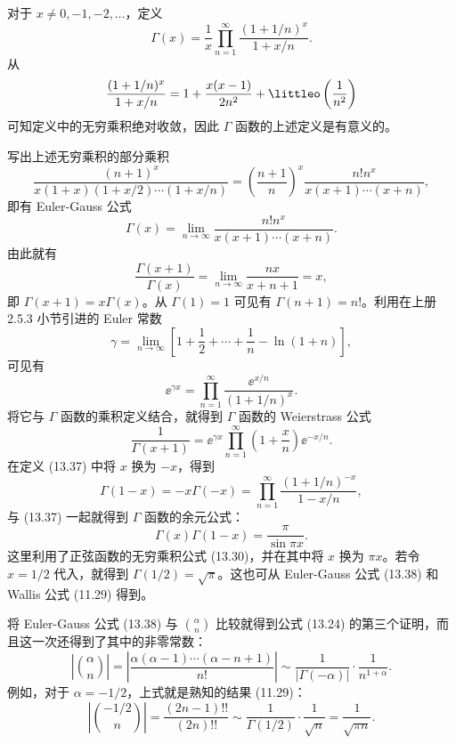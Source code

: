 \begin{xexample}[13.4.4]
对于 $x\neq0,-1,-2,\ldots$，定义
\begin{equation}
\Gamma(x)=\frac1x\prod_{n=1}^{\infty}\frac{(1+1/n)^x}{1+x/n}.
\tag{13.37}
\end{equation}
从
\[
\frac{(1+1/n)^x}{1+x/n}=1+\frac{x(x-1)}{2n^2}+\littleo\left(\frac1{n^2}\right)
\]
可知定义中的无穷乘积绝对收敛，因此 $\Gamma$ 函数的上述定义是有意义的。

写出上述无穷乘积的部分乘积
\[
\frac{(n+1)^x}{x(1+x)(1+x/2)\cdots(1+x/n)}
=\left(\frac{n+1}{n}\right)^x\frac{n!n^x}{x(x+1)\cdots(x+n)},
\]
即有 Euler-Gauss 公式
\begin{equation}
\Gamma(x)=\lim_{n\to\infty}\frac{n!n^x}{x(x+1)\cdots(x+n)}.
\tag{13.38}
\end{equation}
由此就有
\[
\frac{\Gamma(x+1)}{\Gamma(x)}=\lim_{n\to\infty}\frac{nx}{x+n+1}=x,
\]
即 $\Gamma(x+1)=x\Gamma(x)$。从 $\Gamma(1)=1$ 可见有 $\Gamma(n+1)=n!$。利用在上册 2.5.3 小节引进的 Euler 常数
\[
\gamma=\lim_{n\to\infty}\left[1+\frac12+\cdots+\frac1n-\ln(1+n)\right],
\]
可见有
\[
\ee^{\gamma x}=\prod_{n=1}^{\infty}\frac{\ee^{x/n}}{(1+1/n)^x}.
\]
将它与 $\Gamma$ 函数的乘积定义结合，就得到 $\Gamma$ 函数的 Weierstrass 公式
\begin{equation}
\frac1{\Gamma(x+1)}=\ee^{\gamma x}\prod_{n=1}^{\infty}\left(1+\frac xn\right)\ee^{-x/n}.
\tag{13.39}
\end{equation}
在定义 (13.37) 中将 $x$ 换为 $-x$，得到
\[
\Gamma(1-x)=-x\Gamma(-x)=\prod_{n=1}^{\infty}\frac{(1+1/n)^{-x}}{1-x/n},
\]
与 (13.37) 一起就得到 $\Gamma$ 函数的余元公式：
\begin{equation}
\Gamma(x)\Gamma(1-x)=\frac\pi{\sin\pi x}.
\tag{13.40}
\end{equation}
这里利用了正弦函数的无穷乘积公式 (13.30)，并在其中将 $x$ 换为 $\pi x$。若令 $x=1/2$ 代入，就得到 $\Gamma(1/2)=\sqrt\pi$。这也可从 Euler-Gauss 公式 (13.38) 和 Wallis 公式 (11.29) 得到。
\end{xexample}

\begin{xremark}
将 Euler-Gauss 公式 (13.38) 与 $\binom{\alpha}{n}$ 比较就得到公式 (13.24) 的第三个证明，而且这一次还得到了其中的非零常数：
\begin{equation}
\left|\binom{\alpha}{n}\right|=\left|\frac{\alpha(\alpha-1)\cdots(\alpha-n+1)}{n!}\right|\sim\frac1{|\Gamma(-\alpha)|}\cdot\frac1{n^{1+\alpha}}.
\tag{13.41}
\end{equation}
例如，对于 $\alpha=-1/2$，上式就是熟知的结果 (11.29)：
\[
\left|\binom{-1/2}{n}\right|=\frac{(2n-1)!!}{(2n)!!}\sim\frac1{\Gamma(1/2)}\cdot\frac1{\sqrt n}=\frac1{\sqrt{\pi n}}.
\]
\end{xremark}

